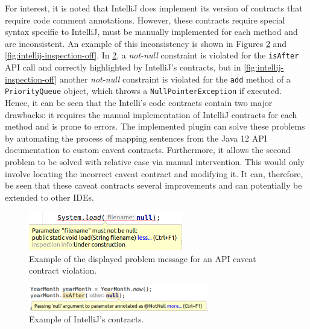 For interest, it is noted that IntelliJ does implement its version of contracts that require code comment annotations. However, these contracts require special syntax specific to IntelliJ, must be manually implemented for each method and are inconsistent. An example of this inconsistency is shown in Figures \ref{fig:intellij-inspection-on} and \ref{fig:intellij-inspection-off}. In \ref{fig:intellij-inspection-on}, a \textit{not-null} constraint is violated for the \lstinline{isAfter} API call and correctly highlighted by IntelliJ's contracts, but in \ref{fig:intellij-inspection-off} another \textit{not-null} constraint is violated for the \lstinline{add} method of a \lstinline{PriorityQueue} object, which throws a \lstinline{NullPointerException} if executed. Hence, it can be seen that the Intelli's code contracts contain two major drawbacks: it requires the manual implementation of IntelliJ contracts for each method and is prone to errors. The implemented plugin can solve these problems by automating the process of mapping sentences from the Java 12 API documentation to custom caveat contracts. Furthermore, it allows the second problem to be solved with relative ease via manual intervention. This would only involve locating the incorrect caveat contract and modifying it. It can, therefore, be seen that these caveat contracts several improvements and can potentially be extended to other IDEs.

\begin{figure}[h]
	\label{fig:plugin-problem}
	\centering
	\includegraphics[width=0.6\textwidth]{figs/plugin-problem.png}
	\caption{Example of the displayed problem message for an API caveat contract violation.}
\end{figure}

\begin{figure}[h]
	\label{fig:intellij-inspection-on}
	\centering
	\includegraphics[width=0.7\textwidth]{figs/intellij-inspection-on.png}
	\caption{Example of IntelliJ's contracts.}
\end{figure}

